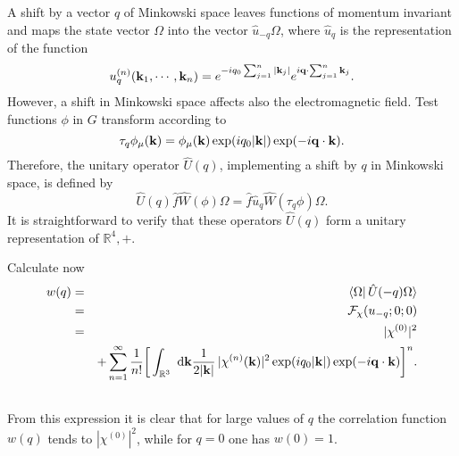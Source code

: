 \documentclass[12pt,a4paper]{article}
\def\Ro{{\mathbb R}}
\def\kk{{\bf k}}
\def\qq{{\bf q}}
\begin{document}
A shift by a vector $q$ of Minkowski space leaves functions of momentum
invariant and maps the state vector $\Omega$ into the vector $\hat u_{-q}\Omega$,
where $\hat u_q$ is the representation of the function
\begin{eqnarray}
u_q^{(n)}(\kk_1,\cdots,\kk_n)=e^{-iq_0\sum_{j=1}^n|\kk_j|}e^{i\qq\cdot\sum_{j=1}^n\kk_j}.
\end{eqnarray}
However, a shift in Minkowski space affects also the
electromagnetic field. Test functions $\phi$ in $G$
transform according to
\begin{equation}
\tau_q\phi_\mu(\kk)=
\phi_\mu(\kk)\exp(iq_0|\kk|)\exp(-i\qq\cdot\kk).
\end{equation}
Therefore, the unitary operator $\hat U(q)$, implementing a shift by $q$ in Minkowski space,
is defined by
\begin{equation}
\hat U(q)\hat f\hat W(\phi)\Omega=\hat f\hat u_{q}\hat W(\tau_q\phi)\Omega.
\end{equation}
It is straightforward to verify that these operators $\hat U(q)$ form
a unitary representation of $\Ro^4,+$.

Calculate now
\begin{eqnarray}
w(q)&=&\langle\Omega|\,\hat U(-q)\Omega\rangle\cr
&=&{\cal F}_\chi(u_{-q};0;0)\cr
&=&|\chi^{(0)}|^2\cr
& &
+\sum_{n=1}^\infty\frac{1}{n!}\bigg[\int_{\Ro^3}\hbox{ d}\kk
\frac{1}{2|\kk|}\,|\chi^{(n)}(\kk)|^2\exp(iq_0|\kk|)\exp(-i\qq\cdot\kk)
\bigg]^n.\cr
& &
\end{eqnarray}
From this expression it is clear that for large values of $q$ the
correlation function $w(q)$ tends to $|\chi^{(0)}|^2$,
while for $q=0$ one has $w(0)=1$.
\end{document}
